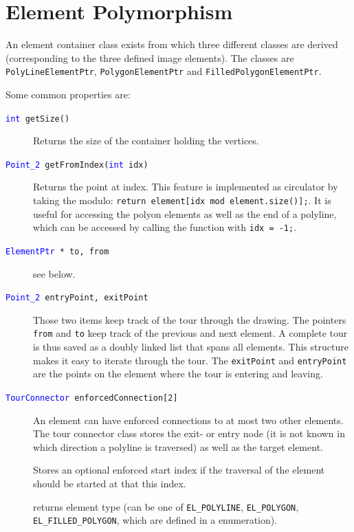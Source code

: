 \section{Element Polymorphism}\label{sec:elem}

An element container class exists from which three different classes are derived (corresponding to the three defined image elements). The classes are \texttt{PolyLineElementPtr}, \texttt{PolygonElementPtr} and \texttt{FilledPolygonElementPtr}.

Some common properties are:

\begin{description}

\item[\texttt{\textcolor{blue}{int} getSize()}] Returns the size of the container holding the vertices.

\item[\texttt{\textcolor{blue}{Point\_2} getFromIndex(\textcolor{blue}{int} idx)}] Returns the point at index. This feature is implemented as circulator by taking the modulo: 
\texttt{return element[idx mod element.size()];}. 
It is useful for accessing the polyon elements as well as the end of a polyline, which can be accessed by calling the
function with \texttt{idx = -1;}.

\item[\texttt{\textcolor{blue}{ElementPtr} * to, from}] see below.
\item[\texttt{\textcolor{blue}{Point\_2} entryPoint, exitPoint}] Those two items keep track of the tour through the drawing. The pointers \texttt{from} and \texttt{to} keep track of the previous and next element. A complete tour is thus saved as a doubly linked list that spans all elements. This structure makes it easy to iterate through the tour.
The \texttt{exitPoint} and \texttt{entryPoint} are the points on the element where the tour is entering and leaving.

\item[\texttt{\textcolor{blue}{TourConnector} enforcedConnection[2]}] An element can have enforced connections to at most two other elements. The tour connector class stores the exit- or entry node (it is not known in which direction a polyline is traversed) as well as the target element.

\item[] Stores an optional enforced start index if the traversal of the element should be started at that this index.

\item[] returns element type (can be one of \texttt{EL\_POLYLINE}, \texttt{EL\_POLYGON}, \texttt{EL\_FILLED\_POLYGON}, which are defined in a enumeration).

\end{description}

